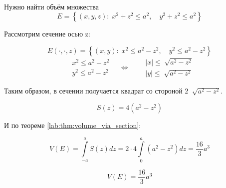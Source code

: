 \documentclass[../main.tex]{subfiles}
\begin{document}
\begin{example}

    ~

    Нужно найти объём множества
    \[ E=\left\{ \left( x,y,z\right):\;x^2+z^2 \leq a^2,\quad y^2+z^2 \leq a^2\right\}\]

    Рассмотрим сечение осью z:

    \[ E\left( \cdot,\cdot,z\right)=\left\{ \left( x, y\right):\;x^2 \leq a^2-z^2,\quad y^2 \leq a^2-z^2\right\}\]
    \begin{equation*}
        \begin{aligned}
            &x^2 \leq a^2-z^2\\
            &y^2 \leq a^2-z^2
        \end{aligned}
       \quad\Longleftrightarrow\quad 
       \begin{aligned}
            &\left| x\right| \leq \sqrt[]{a^2-z^2}\\
            &\left| y\right| \leq \sqrt[]{a^2-z^2}
       \end{aligned}
    \end{equation*}

    Таким образом, в сечении получается квадрат со стороной \( 2\;\sqrt[]{a^2-z^2}\). 

    \[ S\left( z\right)=4\left( a^2-z^2\right)\]

    И по теореме \ref{lab:thm:volume_via_section}:

    \[ V\left( E\right)= \displaystyle\int\limits_{ -a}^{ a} S\left( z\right)dz=2\cdot4 \displaystyle\int\limits_{ 0}^{ a} \left( a^2-z^2\right)dz= \dfrac{ 16}{ 3}a^3\]

    \[ \boxed{V\left( E\right)= \dfrac{ 16}{ 3} a^3}\]
\end{example}
\end{document}
